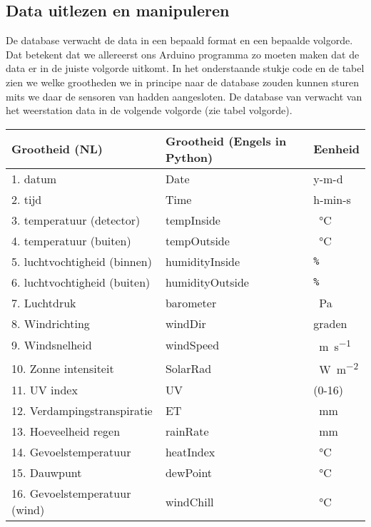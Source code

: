 \subsection{Data uitlezen en manipuleren} De \hisparc database verwacht
de data in een bepaald format en een bepaalde volgorde. Dat betekent dat
we allereerst ons Arduino programma zo moeten maken dat de data er in de
juiste volgorde uitkomt.
In het onderstaande stukje code en de tabel zien we welke grootheden we in principe naar de 
\hisparc database zouden kunnen sturen mits we daar de sensoren van hadden aangesloten.
De database van \hisparc verwacht van het weerstation data in de volgende 
volgorde (zie tabel volgorde). 

\begin{center}
\begin{table}
    \begin{tabular}{ | l | l | l|}
    \hline
    \textbf{Grootheid (NL)}& \textbf{Grootheid (Engels in Python)} & \textbf{Eenheid}  \\ \hline
    1. datum & Date   & y-m-d  \\ \hline
    2. tijd & Time    & h-min-s   \\ \hline
    3. temperatuur (detector) & tempInside & \SI{}{\celsius}    \\ \hline
    4. temperatuur (buiten) & tempOutside  & \SI{}{\celsius}    \\ \hline
    5. luchtvochtigheid (binnen)  & humidityInside & \verb|%|     \\ \hline
    6. luchtvochtigheid (buiten) & humidityOutside  & \verb|%|    \\ \hline
    7. Luchtdruk & barometer &  \SI{}{\pascal}   \\ \hline
    8. Windrichting & windDir &  graden \\ \hline
    9. Windsnelheid & windSpeed  &  \SI{}{\meter\per\second} \\ \hline
    10. Zonne intensiteit & SolarRad & \SI{}{\watt\per\square\meter}    \\ \hline
    11. UV index & UV & (0-16)    \\ \hline
    12. Verdampingstranspiratie & ET &  \SI{}{\milli\meter}    \\ \hline
    13. Hoeveelheid regen & rainRate & \SI{}{\milli\meter} \\ \hline
    14. Gevoelstemperatuur & heatIndex & \SI{}{\celsius} \\ \hline
    15. Dauwpunt & dewPoint & \SI{}{\celsius}    \\ \hline
    16. Gevoelstemperatuur (wind) & windChill & \SI{}{\celsius}    \\ \hline
    

\end{tabular}
\end{table}
\end{center}
